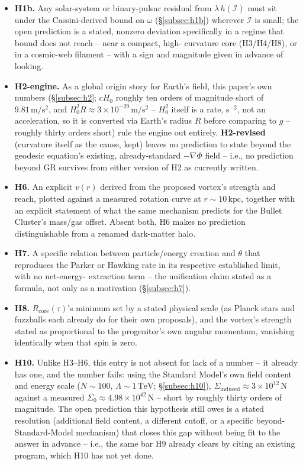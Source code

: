 \documentclass[12pt, a4paper]{article}
\begin{document}
\begin{itemize}
  \item \textbf{H1b.} Any solar-system or binary-pulsar residual from
    $\lambda\,h(\mathcal{I})$ must sit under the Cassini-derived bound
    on $\omega$ (\S\ref{subsec:h1b}) wherever $\mathcal{I}$ is small;
    the open prediction is a stated, nonzero deviation specifically in
    a regime that bound does not reach -- near a compact, high-
    curvature core (H3/H4/H8), or in a cosmic-web filament -- with a
    sign and magnitude given in advance of looking.
  \item \textbf{H2-engine.} As a global origin story for Earth's
    field, this paper's own numbers (\S\ref{subsec:h2}; $cH_0$
    roughly ten orders of magnitude short of $9.81\,\mathrm{m/s^2}$,
    and $H_0^2 R\approx3\times10^{-29}\,\mathrm{m/s^2}$ -- $H_0^2$
    itself is a rate, s$^{-2}$, not an acceleration, so it is
    converted via Earth's radius $R$ before comparing to $g$ --
    roughly thirty orders short) rule the engine out entirely.
    \textbf{H2-revised} (curvature itself as the cause, kept) leaves
    no prediction to state beyond the geodesic equation's existing,
    already-standard $-\nabla\Phi$ field -- i.e., no prediction
    beyond GR survives from either version of H2 as currently
    written.
  \item \textbf{H6.} An explicit $v(r)$ derived from the proposed
    vortex's strength and reach, plotted against a measured rotation
    curve at $r\sim10\,\mathrm{kpc}$, together with an explicit
    statement of what the same mechanism predicts for the Bullet
    Cluster's mass/gas offset. Absent both, H6 makes no prediction
    distinguishable from a renamed dark-matter halo.
  \item \textbf{H7.} A specific relation between particle/energy
    creation and $\theta$ that reproduces the Parker or Hawking rate
    in its respective established limit, with no net-energy-
    extraction term -- the unification claim stated as a formula, not
    only as a motivation (\S\ref{subsec:h7}).
  \item \textbf{H8.} $R_{\mathrm{core}}(\tau)$'s minimum set by a
    stated physical scale (as Planck stars and fuzzballs each already
    do for their own proposals), and the vortex's strength stated as
    proportional to the progenitor's own angular momentum, vanishing
    identically when that spin is zero.
  \item \textbf{H10.} Unlike H3--H6, this entry is not absent for lack
    of a number -- it already has one, and the number fails: using the
    Standard Model's own field content and energy scale
    ($N\sim100$, $\Lambda\sim1\,\mathrm{TeV}$; \S\ref{subsec:h10}),
    $\Sigma_{\text{induced}}\approx3\times10^{12}\,\mathrm{N}$ against
    a measured $\Sigma_0\approx4.98\times10^{42}\,\mathrm{N}$ -- short
    by roughly thirty orders of magnitude. The open prediction this
    hypothesis still owes is a stated resolution (additional field
    content, a different cutoff, or a specific beyond-Standard-Model
    mechanism) that closes this gap without being fit to the answer in
    advance -- i.e., the same bar H9 already clears by citing an
    existing program, which H10 has not yet done.
\end{itemize}
\end{document}
